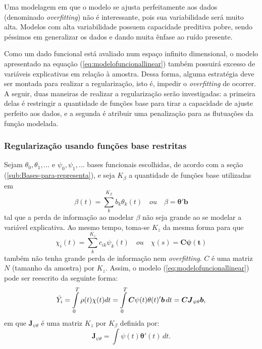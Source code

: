\documentclass[
	12pt,				%
	openright,			%
	oneside,			%
	a4paper,			%
	english,			%
	brazil				%
	]{dissertacao-ufrgs-abntex2}
\begin{document}
Uma modelagem em que o modelo se ajusta perfeitamente aos dados (denominado
\emph{overfitting}) não é interessante, pois sua variabilidade será
muito alta. Modelos com alta variabilidade possuem capacidade preditiva
pobre, sendo péssimos em generalizar os dados e dando muita ênfase
ao ruído presente. 

Como um dado funcional está avaliado num espaço infinito dimensional,
o modelo apresentado na equação (\ref{eq:modelofuncionallinear})
também possuirá excesso de variáveis explicativas em relação à amostra.
Dessa forma, alguma estratégia deve ser montada para realizar a regularização,
isto é, impedir o \emph{overfitting} de ocorrer. A seguir, duas maneiras
de realizar a regularização serão investigadas: a primeira delas é
restringir a quantidade de funções base para tirar a capacidade de
ajuste perfeito aos dados, e a segunda é atribuir uma penalização
para as flutuações da função modelada.


\subsubsection*{Regularização usando funções base restritas}

Sejam $\theta_{0},\theta_{1},...$ e $\psi_{0},\psi_{1},...$ bases
funcionais escolhidas, de acordo com a seção (\ref{sub:Bases-para-representa}),
e seja $K_{\beta}$ a quantidade de funções base utilizadas em
\begin{equation}
\beta(t)=\sum_{k}^{K_{\beta}}b_{k}\theta_{k}(t)\quad ou\quad\beta=\boldsymbol{\theta'b}
\end{equation}
tal que a perda de informação ao modelar $\beta$ não seja grande
ao se modelar a variável explicativa. Ao mesmo tempo, toma-se $K_{z}$
da mesma forma para que
\begin{equation}
\chi_{i}(t)=\sum_{k}^{K_{z}}c_{ik}\psi_{k}(t)\quad ou\quad\chi(s)=\boldsymbol{C\psi(t)}
\end{equation}
também não tenha grande perda de informação nem \emph{overfitting}.
$C$ é uma matriz $N$ (tamanho da amostra) por $K_{z}$. Assim, o
modelo (\ref{eq:modelofuncionallinear}) pode ser reescrito da seguinte
forma:
\begin{equation}
\hat{Y_{i}}=\intop_{0}^{T}\rho(t)\chi(t)dt=\intop_{0}^{T}\boldsymbol{C}\psi(t)\theta(t)'\boldsymbol{b}\, dt=\boldsymbol{C}\boldsymbol{J}_{\psi\theta}\boldsymbol{b},
\end{equation}
em que $\boldsymbol{J}_{\psi\theta}$ é uma matriz $K_{z}$ por $K_{\beta}$
definida por:
\begin{equation}
\boldsymbol{J}_{\psi\theta}=\int\psi(t)\boldsymbol{\theta}'(t)\, dt.
\end{equation}
\end{document}
